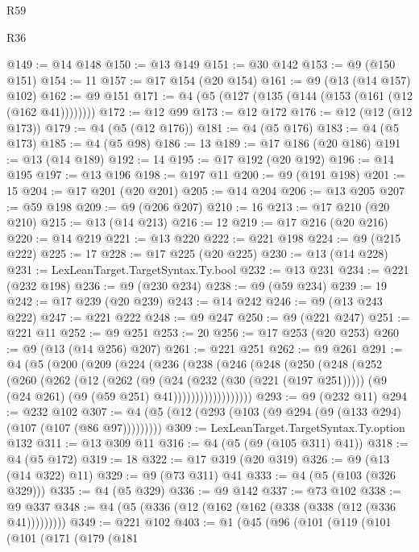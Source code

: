 \begin{lexlean}{R59}
\begin{lexlean}{R36}
\begin{coremodule}
{{{{{{{{{{{{{{{{{{{{{{{{{{{{{{{{{{{{{{{{{{{{{{{{{{{{{{{{{{{{{{{{{{{{{{{{{{{{{{{{{{@149 := @14 @148
@150 := @13 @149
@151 := @30 @142
@153 := @9 (@150 @151)
@154 := 11
@157 := @17 @154 (@20 @154)
@161 := @9 (@13 (@14 @157) @102)
@162 := @9 @151
@171 := @4 (@5 (@127 (@135 (@144 (@153 (@161 (@12 (@162 @41))))))))
@172 := @12 @99
@173 := @12 @172
@176 := @12 (@12 (@12 @173))
@179 := @4 (@5 (@12 @176))
@181 := @4 (@5 @176)
@183 := @4 (@5 @173)
@185 := @4 (@5 @98)
@186 := 13
@189 := @17 @186 (@20 @186)
@191 := @13 (@14 @189)
@192 := 14
@195 := @17 @192 (@20 @192)
@196 := @14 @195
@197 := @13 @196
@198 := @197 @11
@200 := @9 (@191 @198)
@201 := 15
@204 := @17 @201 (@20 @201)
@205 := @14 @204
@206 := @13 @205
@207 := @59 @198
@209 := @9 (@206 @207)
@210 := 16
@213 := @17 @210 (@20 @210)
@215 := @13 (@14 @213)
@216 := 12
@219 := @17 @216 (@20 @216)
@220 := @14 @219
@221 := @13 @220
@222 := @221 @198
@224 := @9 (@215 @222)
@225 := 17
@228 := @17 @225 (@20 @225)
@230 := @13 (@14 @228)
@231 := LexLeanTarget.TargetSyntax.Ty.bool
@232 := @13 @231
@234 := @221 (@232 @198)
@236 := @9 (@230 @234)
@238 := @9 (@59 @234)
@239 := 19
@242 := @17 @239 (@20 @239)
@243 := @14 @242
@246 := @9 (@13 @243 @222)
@247 := @221 @222
@248 := @9 @247
@250 := @9 (@221 @247)
@251 := @221 @11
@252 := @9 @251
@253 := 20
@256 := @17 @253 (@20 @253)
@260 := @9 (@13 (@14 @256) @207)
@261 := @221 @251
@262 := @9 @261
@291 := @4
    (@5
      (@200
        (@209
          (@224
            (@236
              (@238
                (@246
                  (@248
                    (@250
                      (@248
                        (@252
                          (@260
                            (@262
                              (@12
                                (@262
                                  (@9
                                    (@24 (@232 (@30 (@221 (@197 @251)))))
                                    (@9 (@24 @261) (@9 (@59 @251) @41))))))))))))))))))
@293 := @9 (@232 @11)
@294 := @232 @102
@307 := @4 (@5 (@12 (@293 (@103 (@9 @294 (@9 (@133 @294) (@107 (@107 (@86 @97)))))))))
@309 := LexLeanTarget.TargetSyntax.Ty.option @132
@311 := @13 @309 @11
@316 := @4 (@5 (@9 (@105 @311) @41))
@318 := @4 (@5 @172)
@319 := 18
@322 := @17 @319 (@20 @319)
@326 := @9 (@13 (@14 @322) @11)
@329 := @9 (@73 @311) @41
@333 := @4 (@5 (@103 (@326 @329)))
@335 := @4 (@5 @329)
@336 := @9 @142
@337 := @73 @102
@338 := @9 @337
@348 := @4 (@5 (@336 (@12 (@162 (@162 (@338 (@338 (@12 (@336 @41)))))))))
@349 := @221 @102
@403 := @1
    (@45
      (@96
        (@101
          (@119
            (@101
              (@101
                (@171
                  (@179
                    (@181
}}}}}}}}}}}}}}}}}}}}}}}}}}}}}}}}}}}}}}}}}}}}}}}}}}}}}}}}}}}}}}}}}}}}}}}}}}}}}}}}}}
\end{coremodule}
\end{lexlean}
\end{lexlean}
